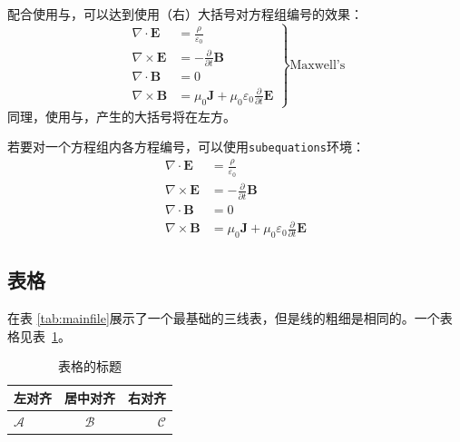        配合使用与\cmd{\}}，可以达到使用（右）大括号对方程组编号的效果：
        \begin{equation}\left.
            \begin{aligned}
                \nabla  \cdot \mathbf{E}    &= \frac{\rho }{\varepsilon _0} \\
                \nabla \times \mathbf{E}    &= -\frac{\partial}{\partial t}\mathbf{B}\\
                \nabla  \cdot \mathbf{B}    &= 0 \\
                \nabla \times \mathbf{B}    &= \mu_0\mathbf{J}+\mu_0\varepsilon _0\frac{\partial}{\partial t}\mathbf{E}
            \end{aligned} \right\}\text{Maxwell's}
        \end{equation}
        同理，使用\cmd{\}}与，产生的大括号将在左方。

        若要对一个方程组内各方程编号，可以使用\texttt{subequations}环境：
        \begin{subequations}
            \begin{align}
                \nabla  \cdot \mathbf{E}    &= \frac{\rho }{\varepsilon _0} \\
                \nabla \times \mathbf{E}    &= -\frac{\partial}{\partial t}\mathbf{B}\\
                \nabla  \cdot \mathbf{B}    &= 0 \\
                \nabla \times \mathbf{B}    &= \mu_0\mathbf{J}+\mu_0\varepsilon _0\frac{\partial}{\partial t}\mathbf{E}
            \end{align}
        \end{subequations}

    \subsection{表格}\label{subsec:tab}
        在表 \ref{tab:mainfile}展示了一个最基础的三线表，但是线的粗细是相同的。一个表格见表~\ref{tab:ATable}。
        \begin{table}[H]
            \centering
            \caption{表格的标题}
            \label{tab:ATable}
            \begin{tabular}{lcr}
                \hline 
                    左对齐 & 居中对齐 & 右对齐\\ 
                \hline 
                    $\mathcal{A}$  & $\mathcal{B}$ & $\mathcal{C}$\\
                \hline 
            \end{tabular}
        \end{table}

